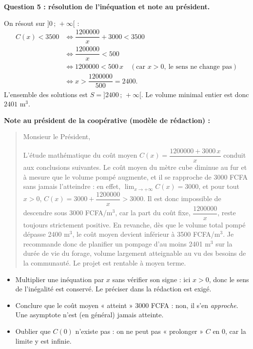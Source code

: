 \documentclass[11pt]{article}
\begin{document}
\begin{exoresolu}
\textbf{Question 5 : résolution de l'inéquation et note au président.}

On résout sur $]0\,;\,+\infty[$ :
\begin{align*}
C(x) < \num{3500} &\iff \dfrac{\num{1200000}}{x} + \num{3000} < \num{3500} \\
&\iff \dfrac{\num{1200000}}{x} < 500 \\
&\iff \num{1200000} < 500\,x \quad (\text{car } x > 0,\ \text{le sens ne change pas}) \\
&\iff x > \dfrac{\num{1200000}}{500} = \num{2400}.
\end{align*}
L'ensemble des solutions est $S = ]\num{2400}\,;\,+\infty[$. Le volume minimal entier est donc $\num{2401}$ m$^3$.

\textbf{Note au président de la coopérative (modèle de rédaction) :}

\begin{quote}
Monsieur le Président,

L'étude mathématique du coût moyen $C(x) = \dfrac{\num{1200000} + \num{3000}\,x}{x}$ conduit aux conclusions suivantes. Le coût moyen du mètre cube diminue au fur et à mesure que le volume pompé augmente, et il se rapproche de \num{3000} FCFA sans jamais l'atteindre : en effet, $\displaystyle\lim_{x \to +\infty} C(x) = \num{3000}$, et pour tout $x > 0$, $C(x) = \num{3000} + \dfrac{\num{1200000}}{x} > \num{3000}$. Il est donc impossible de descendre sous \num{3000} FCFA/m$^3$, car la part du coût fixe, $\dfrac{\num{1200000}}{x}$, reste toujours strictement positive. En revanche, dès que le volume total pompé dépasse \num{2400} m$^3$, le coût moyen devient inférieur à \num{3500} FCFA/m$^3$. Je recommande donc de planifier un pompage d'au moins \num{2401} m$^3$ sur la durée de vie du forage, volume largement atteignable au vu des besoins de la communauté. Le projet est rentable à moyen terme.
\end{quote}
\end{exoresolu}

\begin{attention}
\begin{itemize}
\item Multiplier une inéquation par $x$ sans vérifier son signe : ici $x > 0$, donc le sens de l'inégalité est conservé. Le préciser dans la rédaction est exigé.
\item Conclure que le coût moyen « atteint » \num{3000} FCFA : non, il s'en \emph{approche}. Une asymptote n'est (en général) jamais atteinte.
\item Oublier que $C(0)$ n'existe pas : on ne peut pas « prolonger » $C$ en $0$, car la limite y est infinie.
\end{itemize}
\end{attention}
\end{document}
